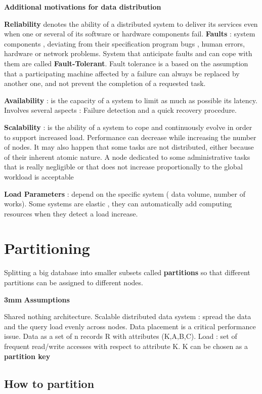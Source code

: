 \documentclass{article}
\begin{document}
\textbf{Additional motivations for data distribution}

\textbf{Reliability} denotes the ability of a distributed system to deliver its services even when one or several of its software or hardware components fail.
\textbf{Faults} : system components , deviating from their specification program bugs , human errors, hardware or network problems. System that anticipate faults and can cope with them are called \textbf{Fault-Tolerant}.
Fault tolerance is a based on the assumption that a participating machine affected by a failure can always be replaced by another one, and not prevent the completion of a requested task.

\textbf{Availability} : is the capacity of a system to limit as much as possible its latency. Involves several aspects : Failure detection and a quick recovery procedure.

\textbf{Scalability} : is the ability of a system to cope and continuously evolve in order to support increased load. Performance can decrease while increasing the number of nodes. It may also happen that some tasks are not distributed, either because of their inherent atomic nature. A node dedicated to some administrative tasks that is really negligible or that does not increase proportionally to the global workload is acceptable

\textbf{Load Parameters} : depend on the specific system ( data volume, number of works). Some systems are elastic , they can automatically add computing resources when they detect a load increase. 

\section{Partitioning}
Splitting a big database into smaller subsets called \textbf{partitions} so that different partitions can be assigned to different nodes.

\textbf{3mm}
\textbf{Assumptions}

Shared nothing architecture. Scalable distributed data system : spread the data and the query load evenly across nodes. Data placement is a critical performance issue.
Data as a set of n records R with attributes (K,A,B,C).
Load : set of frequent read/write accesses with respect to attribute K. K can be chosen as a \textbf{partition key}

\subsection{How to partition}
\end{document}
